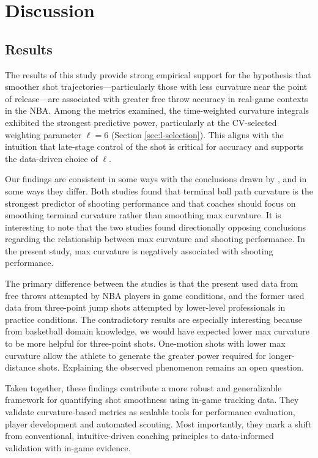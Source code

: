 \documentclass[Review,sageh,times,doublespace]{sagej}
\begin{document}
  \section{Discussion}

    \subsection{Results}
      
      The results of this study provide strong empirical support for the hypothesis that smoother shot trajectories---particularly those with less curvature near the point of release---are associated with greater free throw accuracy in real-game contexts in the NBA. Among the metrics examined, the time-weighted curvature integrals exhibited the strongest predictive power, particularly at the CV-selected weighting parameter $\ell = 6$ (Section \ref{sec:l-selection}). This aligns with the intuition that late-stage control of the shot is critical for accuracy and supports the data-driven choice of $\ell$.
      
      Our findings are consistent in some ways with the conclusions drawn by \citet{slegers_role_2024}, and in some ways they differ. Both studies found that terminal ball path curvature is the strongest predictor of shooting performance and that coaches should focus on smoothing terminal curvature rather than smoothing max curvature. It is interesting to note that the two studies found directionally opposing conclusions regarding the relationship between max curvature and shooting performance. In the present study, max curvature is negatively associated with shooting performance.

      The primary difference between the studies is that the present used data from free throws attempted by NBA players in game conditions, and the former used data from three-point jump shots attempted by lower-level professionals in practice conditions. The contradictory results are especially interesting because from basketball domain knowledge, we would have expected lower max curvature to be more helpful for three-point shots. One-motion shots with lower max curvature allow the athlete to generate the greater power required for longer-distance shots. Explaining the observed phenomenon remains an open question. 
      
      Taken together, these findings contribute a more robust and generalizable framework for quantifying shot smoothness using in-game tracking data. They validate curvature-based metrics as scalable tools for performance evaluation, player development and automated scouting. Most importantly, they mark a shift from conventional, intuitive-driven coaching principles to data-informed validation with in-game evidence.
\end{document}
